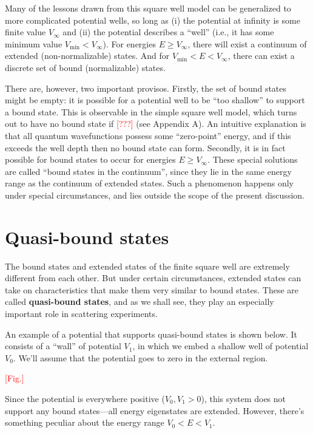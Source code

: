 \documentclass[pra,11pt]{revtex4}
\begin{document}
Many of the lessons drawn from this square well model can be
generalized to more complicated potential wells, so long as (i) the
potential at infinity is some finite value $V_\infty$ and (ii) the
potential describes a ``well'' (i.e., it has some minimum value
$V_{\mathrm{min}} < V_\infty$).  For energies $E \ge V_\infty$, there
will exist a continuum of extended (non-normalizable) states.  And for
$V_{\mathrm{min}} < E < V_\infty$, there can exist a discrete set of
bound (normalizable) states.

There are, however, two important provisos.  Firstly, the set of bound
states might be empty: it is possible for a potential well to be ``too
shallow'' to support a bound state.  This is observable in the simple
square well model, which turns out to have no bound state if
\textcolor{red}{[???]} (see Appendix A).  An intuitive explanation is
that all quantum wavefunctions possess some ``zero-point'' energy, and
if this exceeds the well depth then no bound state can form.
Secondly, it is in fact possible for bound states to occur for
energies $E \ge V_\infty$.  These special solutions are called ``bound
states in the continuum'', since they lie in the same energy range as
the continuum of extended states.  Such a phenomenon happens only
under special circumstances, and lies outside the scope of the present
discussion.

\section{Quasi-bound states}

The bound states and extended states of the finite square well are
extremely different from each other.  But under certain circumstances,
extended states can take on characteristics that make them very
similar to bound states.  These are called \textbf{quasi-bound
  states}, and as we shall see, they play an especially important role
in scattering experiments.

An example of a potential that supports quasi-bound states is shown
below.  It consists of a ``wall'' of potential $V_1$, in which we
embed a shallow well of potential $V_0$.  We'll assume that the
potential goes to zero in the external region.

\textcolor{red}{[Fig.]}

Since the potential is everywhere positive ($V_0, V_1 > 0$), this
system does not support any bound states---all energy eigenstates are
extended.  However, there's something peculiar about the energy range
$V_0 < E < V_1$.
\end{document}
